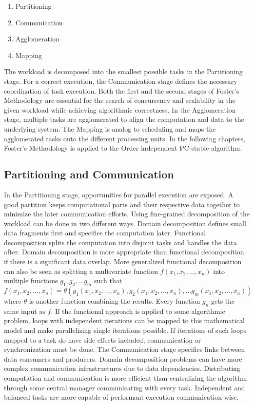 \begin{enumerate}
    \item Partitioning
    \item Communication
    \item Agglomeration 
    \item Mapping
\end{enumerate}

The workload is decomposed into the smallest possible tasks in the Partitioning stage. For a correct execution, the Communication stage defines the necessary coordination of task execution. Both the first and the second stages of Foster's Methodology are essential for the search of concurrency and scalability in the given workload while achieving algorithmic correctness. In the Agglomeration stage, multiple tasks are agglomerated to align the computation and data to the underlying system. The Mapping is analog to scheduling and maps the agglomerated tasks onto the different processing units. In the following chapters, Foster's Methodology is applied to the Order independent PC-stable algorithm.

\subsection{Partitioning and Communication}
In the Partitioning stage, opportunities for parallel execution are exposed. A good partition keeps computational parts and their respective data together to minimize the later communication efforts. Using fine-grained decomposition of the workload can be done in two different ways. Domain decomposition defines small data fragments first and specifies the computation later. Functional decomposition splits the computation into disjoint tasks and handles the data after. Domain decomposition is more appropriate than functional decomposition if there is a significant data overlap.
More generalized functional decomposition can also be seen as splitting a multivariate function $f(x_1,x_2,...,x_n)$ into multiple functions ${g_1,g_2,...g_m}$ such that $f(x_1,x_2,...,x_n) = \theta(g_1(x_1,x_2,...,x_n),g_2(x_1,x_2,...,x_n),...g_m(x_1,x_2,...,x_n))$ where $\theta$ is another function combining the results. Every function $g_n$ gets the same input as $f$. If the functional approach is applied to some algorithmic problem, loops with independent iterations can be mapped to this mathematical model and make parallelizing single iterations possible. If iterations of such loops mapped to a task do have side effects included, communication or synchronization must be done.
The Communication stage specifies links between data consumers and producers. Domain decomposition problems can have more complex communication infrastructures due to data dependencies. Distributing computation and communication is more efficient than centralizing the algorithm through some central manager communicating with every task. Independent and balanced tasks are more capable of performant execution communication-wise.

